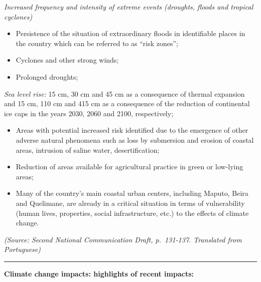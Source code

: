 \documentclass[
]{book}
\begin{document}
\emph{Increased frequency and intensity of extreme events (droughts, floods and tropical cyclones)}

\begin{itemize}
\item
  Persistence of the situation of extraordinary floods in identifiable places in the country which can be referred to as ``risk zones'';
\item
  Cyclones and other strong winds;
\item
  Prolonged droughts;
\end{itemize}

\emph{Sea level rise:}
15 cm, 30 cm and 45 cm as a consequence of thermal expansion and 15 cm, 110 cm and 415 cm as a consequence of the reduction of continental ice caps in the years 2030, 2060 and 2100, respectively;

\begin{itemize}
\item
  Areas with potential increased risk identified due to the emergence of other adverse natural phenomena such as loss by submersion and erosion of coastal areas, intrusion of saline water, desertification;
\item
  Reduction of areas available for agricultural practice in green or low-lying areas;
\item
  Many of the country's main coastal urban centers, including Maputo, Beira and Quelimane, are already in a critical situation in terms of vulnerability (human lives, properties, social infrastructure, etc.) to the effects of climate change.
\end{itemize}

\emph{(Source: Second National Communication Draft, p.~131-137. Translated from Portuguese)}

\begin{center}\rule{0.5\linewidth}{0.5pt}\end{center}

\textbf{Climate change impacts: highlights of recent impacts:}
\end{document}

